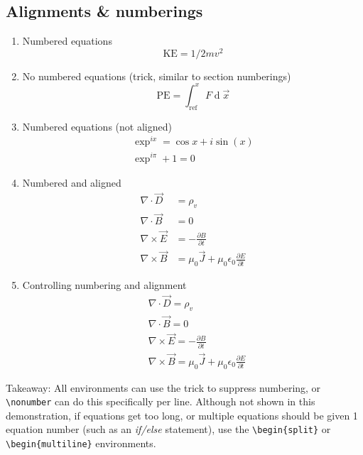 \documentclass[12pt]{article}
\begin{document}
\subsection*{Alignments \& numberings}
\begin{enumerate}
	\item Numbered equations
	\begin{equation}
		\text{KE} = 1/2mv^2
	\end{equation}
	
	\item No numbered equations ({\*}trick, similar to section numberings)
	\begin{equation*}
		\text{PE} = \int_{\text{ref}}^{x} F \operatorname{d}\!\overrightarrow{x}
	\end{equation*}	
	
	\item Numbered equations (not aligned)
	\begin{gather}
		\exp^{ix} = \cos{x} + i\sin(x) \\
		\exp^{i\pi} + 1 = 0
	\end{gather}
	
	\item Numbered and aligned
	\begin{align}
		\nabla \cdot \vec{D} &= \rho_v \\
		\nabla \cdot \vec{B} &= 0 \\
		\nabla \times \vec{E} &= - \frac{\partial B}{\partial t} \\
		\nabla \times \vec{B} &= \mu_{0}\vec{J} +
		\mu_{0}\epsilon_{0}\frac{\partial E}{\partial t}
	\end{align}
	
	\item Controlling numbering and alignment
	\begin{align}
		&\nabla \cdot \vec{D} = \rho_v \nonumber \\
		&\nabla \cdot \vec{B} = 0 \\
		&\nabla \times \vec{E} = - \frac{\partial B}{\partial t} \\
		&\nabla \times \vec{B} = \mu_{0}\vec{J} +
		\mu_{0}\epsilon_{0}\frac{\partial E}{\partial t} \nonumber
	\end{align}
\end{enumerate}
Takeaway: All environments can use the \* trick to suppress numbering, or \verb!\nonumber! can do this specifically per line. Although not shown in this demonstration, if equations get too long, or multiple equations should be given 1 equation number (such as an \textit{if/else} statement), use the \verb!\begin{split}! or \verb!\begin{multiline}! environments.
\end{document}
